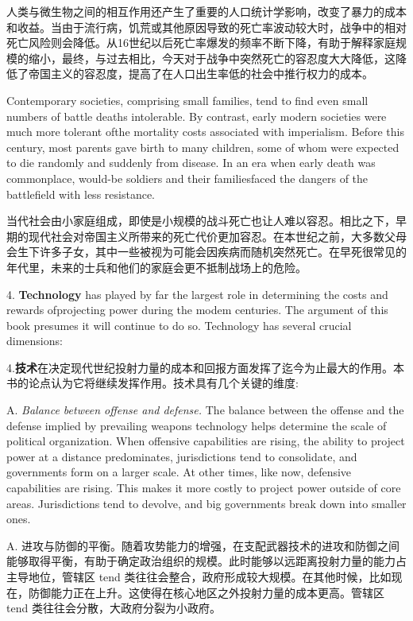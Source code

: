 \begin{Parallel}{97mm}{72mm}
  \ParallelRText
  {人类与微生物之间的相互作用还产生了重要的人口统计学影响，改变了暴力的成本和收益。当由于流行病，饥荒或其他原因导致的死亡率波动较大时，战争中的相对死亡风险则会降低。从16世纪以后死亡率爆发的频率不断下降，有助于解释家庭规模的缩小，最终，与过去相比，今天对于战争中突然死亡的容忍度大大降低，这降低了帝国主义的容忍度，提高了在人口出生率低的社会中推行权力的成本。}
  \ParallelPar


  \ParallelLText
  {Contemporary societies, comprising small families, tend to find even small numbers of battle deaths intolerable. By contrast, early modern societies were much more tolerant ofthe mortality costs associated with imperialism. Before this century, most parents gave birth to many children, some of whom were expected to die randomly and suddenly from disease. In an era when early death was commonplace, would-be soldiers and their familiesfaced the dangers of the battlefield with less resistance.}
  
  \ParallelRText
  {当代社会由小家庭组成，即使是小规模的战斗死亡也让人难以容忍。相比之下，早期的现代社会对帝国主义所带来的死亡代价更加容忍。在本世纪之前，大多数父母会生下许多子女，其中一些被视为可能会因疾病而随机突然死亡。在早死很常见的年代里，未来的士兵和他们的家庭会更不抵制战场上的危险。
  }
  \ParallelPar


  \ParallelLText
  {4. \textbf{Technology} has played by far the largest role in determining the costs and rewards ofprojecting power during the modem centuries. The argument of this book presumes it will continue to do so. Technology has several crucial dimensions: }
  
  \ParallelRText
  {4.\textbf{技术}在决定现代世纪投射力量的成本和回报方面发挥了迄今为止最大的作用。本书的论点认为它将继续发挥作用。技术具有几个关键的维度:}
  \ParallelPar



  \ParallelLText
  {A. \emph{Balance between offense and defense.} The balance between the offense and the defense implied by prevailing weapons technology helps determine the scale of political organization. When offensive capabilities are rising, the ability to project power at a distance predominates, jurisdictions tend to consolidate, and governments form on a larger scale. At other times, like now, defensive capabilities are rising. This makes it more costly to project power outside of core areas. Jurisdictions tend to devolve, and big governments break down into smaller ones. }
  
  \ParallelRText
  {A. 进攻与防御的平衡。随着攻势能力的增强，在支配武器技术的进攻和防御之间能够取得平衡，有助于确定政治组织的规模。此时能够以远距离投射力量的能力占主导地位，管辖区 tend 类往往会整合，政府形成较大规模。在其他时候，比如现在，防御能力正在上升。这使得在核心地区之外投射力量的成本更高。管辖区 tend 类往往会分散，大政府分裂为小政府。}
  \ParallelPar



\end{Parallel}

